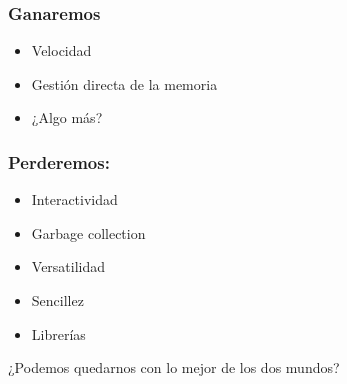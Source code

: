 \documentclass{beamer}
\begin{document}
\begin{frame}
  \frametitle{Ganaremos}
  \begin{itemize}
  \item Velocidad
  \item Gestión directa de la memoria
  \item ¿Algo más?
  \end{itemize}
\end{frame}

\begin{frame}
  \frametitle{Perderemos:}
  \begin{itemize}
  \item Interactividad
  \item Garbage collection
  \item Versatilidad
  \item Sencillez
  \item Librerías
  \end{itemize}
\end{frame}

\begin{frame}
  \begin{center}
    \begin{LARGE}
    ¿Podemos quedarnos con lo mejor de los dos mundos?      
    \end{LARGE}
  \end{center}
\end{frame}
\end{document}

